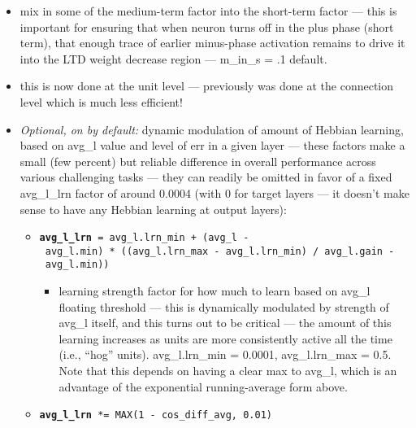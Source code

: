 \begin{itemize}
\begin{itemize}
    \begin{itemize}
    \tightlist
    \item
      mix in some of the medium-term factor into the short-term factor
      --- this is important for ensuring that when neuron turns off in
      the plus phase (short term), that enough trace of earlier
      minus-phase activation remains to drive it into the LTD weight
      decrease region --- m\_in\_s = .1 default.
    \item
      this is now done at the unit level --- previously was done at the
      connection level which is much less efficient!
    \end{itemize}
  \end{itemize}
\end{itemize}

\begin{itemize}
  \tightlist
  \item \emph{Optional, on by default:} dynamic modulation of amount of
    Hebbian learning, based on avg\_l value and level of err in a given
    layer --- these factors make a small (few percent) but reliable
    difference in overall performance across various challenging tasks
    --- they can readily be omitted in favor of a fixed avg\_l\_lrn
    factor of around 0.0004 (with 0 for target layers --- it doesn't
    make sense to have any Hebbian learning at output layers):

    \begin{itemize}
    \tightlist
    \item
      \textbf{\texttt{avg\_l\_lrn}}\texttt{\ =\ avg\_l.lrn\_min\ +\ (avg\_l\ -\ avg\_l.min)\ *\ ((avg\_l.lrn\_max\ -\ avg\_l.lrn\_min)\ /\ avg\_l.gain\ -\ avg\_l.min))}

      \begin{itemize}
      \tightlist
      \item
        learning strength factor for how much to learn based on avg\_l
        floating threshold --- this is dynamically modulated by
        strength of avg\_l itself, and this turns out to be critical
        --- the amount of this learning increases as units are more
        consistently active all the time (i.e., ``hog'' units).
        avg\_l.lrn\_min = 0.0001, avg\_l.lrn\_max = 0.5. Note that this
        depends on having a clear max to avg\_l, which is an advantage
        of the exponential running-average form above.
      \end{itemize}
    \item
      \textbf{\texttt{avg\_l\_lrn}}\texttt{\ *=\ MAX(1\ -\ cos\_diff\_avg,\ 0.01)}


\end{itemize}
\end{itemize}
